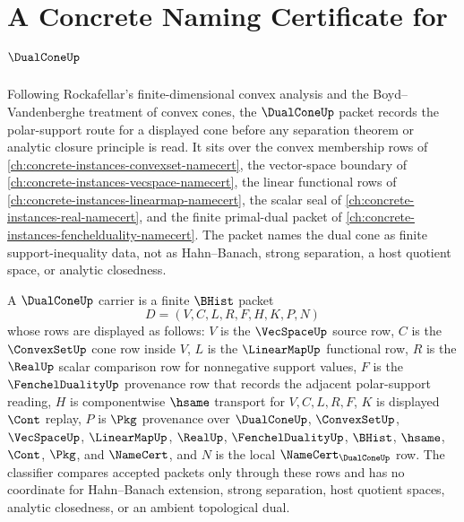 \chapter{A Concrete Naming Certificate for $\DualConeUp$}
\label{ch:concrete-instances-dual-cone-namecert}

Following Rockafellar's finite-dimensional convex analysis and the Boyd--Vandenberghe treatment of convex cones, the $\DualConeUp$ packet records the polar-support route for a displayed cone before any separation theorem or analytic closure principle is read. It sits over the convex membership rows of \autoref{ch:concrete-instances-convexset-namecert}, the vector-space boundary of \autoref{ch:concrete-instances-vecspace-namecert}, the linear functional rows of \autoref{ch:concrete-instances-linearmap-namecert}, the scalar seal of \autoref{ch:concrete-instances-real-namecert}, and the finite primal-dual packet of \autoref{ch:concrete-instances-fenchelduality-namecert}. The packet names the dual cone as finite support-inequality data, not as Hahn--Banach, strong separation, a host quotient space, or analytic closedness.

\begin{definition}
\label{def:dual-cone-carrier}
A $\DualConeUp$ carrier is a finite $\BHist$ packet
$$
D=(V,C,L,R,F,H,K,P,N)
$$
whose rows are displayed as follows: $V$ is the $\VecSpaceUp$ source row, $C$ is the $\ConvexSetUp$ cone row inside $V$, $L$ is the $\LinearMapUp$ functional row, $R$ is the $\RealUp$ scalar comparison row for nonnegative support values, $F$ is the $\FenchelDualityUp$ provenance row that records the adjacent polar-support reading, $H$ is componentwise $\hsame$ transport for $V,C,L,R,F$, $K$ is displayed $\Cont$ replay, $P$ is $\Pkg$ provenance over $\DualConeUp$, $\ConvexSetUp$, $\VecSpaceUp$, $\LinearMapUp$, $\RealUp$, $\FenchelDualityUp$, $\BHist$, $\hsame$, $\Cont$, $\Pkg$, and $\NameCert$, and $N$ is the local $\NameCert_{\DualConeUp}$ row. The classifier compares accepted packets only through these rows and has no coordinate for Hahn--Banach extension, strong separation, host quotient spaces, analytic closedness, or an ambient topological dual.
\end{definition}

